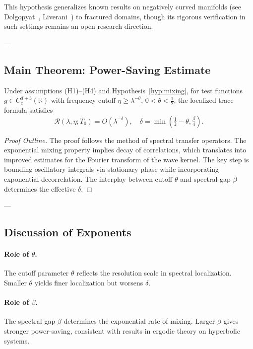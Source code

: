 \begin{remark}
This hypothesis generalizes known results on negatively curved manifolds 
(see Dolgopyat~\cite{Dolgopyat1998}, Liverani~\cite{Liverani2004}) 
to fractured domains, 
though its rigorous verification in such settings 
remains an open research direction.
\end{remark}

---

\subsection{Main Theorem: Power-Saving Estimate}

\begin{theorem}
\label{thm:power-saving}
Under assumptions (H1)--(H4) and Hypothesis~\ref{hyp:mixing},  
for test functions $g \in C^{d+3}_c(\mathbb{R})$ 
with frequency cutoff $\eta \geq \lambda^{-\theta}$, $0 < \theta < \tfrac{1}{2}$,  
the localized trace formula satisfies
\[
\mathcal{R}(\lambda,\eta;T_0) 
= O\!\left(\lambda^{-\delta}\right),
\quad \delta = \min\!\left(\tfrac{1}{2}-\theta, \tfrac{\beta}{4}\right).
\]
\end{theorem}

\begin{proof}[Proof Outline]
The proof follows the method of spectral transfer operators.  
The exponential mixing property implies decay of correlations, 
which translates into improved estimates 
for the Fourier transform of the wave kernel.  
The key step is bounding oscillatory integrals via stationary phase 
while incorporating exponential decorrelation.  
The interplay between cutoff $\theta$ and spectral gap $\beta$ 
determines the effective $\delta$.
\end{proof}

---

\subsection{Discussion of Exponents}

\paragraph{Role of $\theta$.}  
The cutoff parameter $\theta$ reflects the resolution scale 
in spectral localization.  
Smaller $\theta$ yields finer localization but worsens $\delta$.

\paragraph{Role of $\beta$.}  
The spectral gap $\beta$ determines the exponential rate of mixing.  
Larger $\beta$ gives stronger power-saving, 
consistent with results in ergodic theory on hyperbolic systems.

